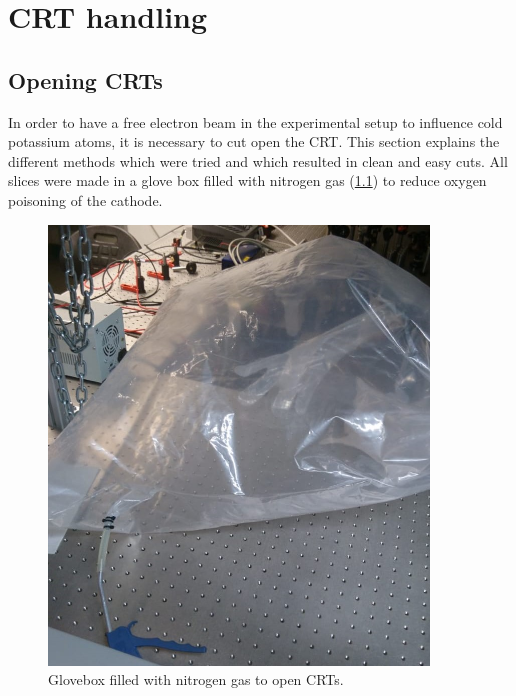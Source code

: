 
\chapter{CRT handling}
\label{chap:CRT handling}

\section{Opening CRTs}
\label{sec:Opening CRTs}

In order to have a free electron beam in the experimental setup to influence cold potassium atoms, it is necessary to cut open the CRT. This section explains the different methods which were tried and which resulted in clean and easy cuts. All slices were made in a glove box filled with nitrogen gas (\cref{fig:glovebox}) to reduce oxygen poisoning of the cathode.

\begin{figure}[h]
	\centering
	\includegraphics[width=0.9\textwidth]{./Chapters/CRT-handling/glove_box}
	\caption{Glovebox filled with nitrogen gas to open CRTs.}
	\label{fig:glovebox}
\end{figure}


